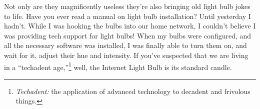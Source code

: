 Not only are they magnificently useless they're also bringing old light
bulb jokes to life. Have you ever read a manual on light bulb
installation? Until yesterday I hadn't. While I was hooking the bulbs
into our home network, I couldn't believe I was providing tech support
for light bulbs! When my bulbs were configured, and all the necessary
software was installed, I was finally able to turn them on, and wait for
it, adjust their hue and intensity. If you've suspected that we are
living in a ``techadent age,''\footnote{\emph{Techadent:} the application of advanced technology to decadent
  and frivolous things.
}%
well, the Internet Light Bulb is its standard candle.





%

